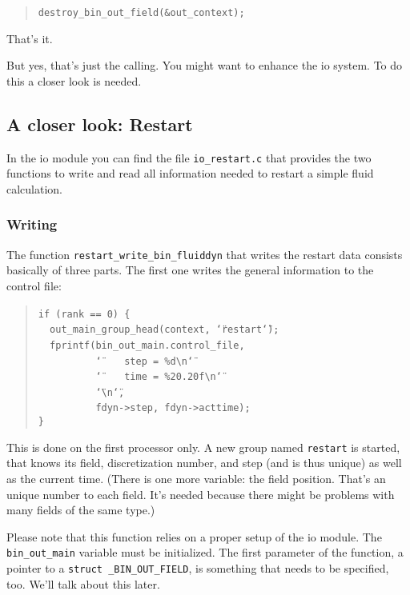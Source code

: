 \begin{quote}
\texttt{destroy{\_}bin{\_}out{\_}field({\&}out{\_}context); }
\end{quote}
That's it.

But yes, that's just the calling. You might want to enhance the io
system. To do this a closer look is needed.


\subsection{A closer look: Restart}

In the io module you can find the file \texttt{io{\_}restart.c}
that provides the two functions to write and read all information
needed to restart a simple fluid calculation.


\subsubsection{Writing}

The function \texttt{restart{\_}write{\_}bin{\_}fluiddyn} that
writes the restart data consists basically of three parts. The first
one writes the general information to the control file: 

\begin{quote}
\texttt{if~(rank~==~0)~{\{}~}~\\
 \texttt{~~out{\_}main{\_}group{\_}head(context,~\char`\"{}restart\char`\"{});~}~\\
 \texttt{~~fprintf(bin{\_}out{\_}main.control{\_}file,~}~\\
 \texttt{~~~~~~~~~~\char`\"{}~~~~step~=~{\%}d{\textbackslash{}}n\char`\"{}~}~\\
 \texttt{~~~~~~~~~~\char`\"{}~~~~time~=~{\%}20.20f{\textbackslash{}}n\char`\"{}~}~\\
 \texttt{~~~~~~~~~~\char`\"{}{\textbackslash{}}n\char`\"{},~}~\\
 \texttt{~~~~~~~~~~fdyn->step,~fdyn->acttime);~}~\\
 \texttt{{\}} }
\end{quote}
This is done on the first processor only. A new group named \texttt{restart}
is started, that knows its field, discretization number, and step
(and is thus unique) as well as the current time. (There is one more
variable: the field position. That's an unique number to each field.
It's needed because there might be problems with many fields of the
same type.)

Please note that this function relies on a proper setup of the io
module. The \texttt{bin{\_}out{\_}main} variable must be initialized.
The first parameter of the function, a pointer to a \texttt{struct
{\_}BIN{\_}OUT{\_}FIELD}, is something that needs to be specified,
too. We'll talk about this later.

